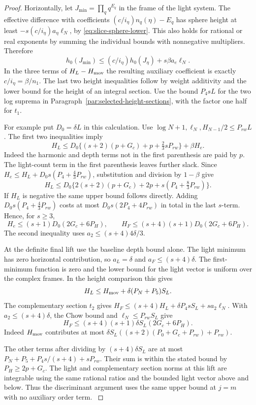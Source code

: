 \begin{proof}
Horizontally, let
\(J_{\min}=\prod_q q^{E_q}\) in the frame of the light system.
The effective difference with coefficients
\((c/i_\eta)n_q(\eta)-E_q\) has sphere height at least
\(-s(c/i_\eta)a_\eta\ell_N\), by
\eqref{eq:slice-sphere-lower}. This also holds for rational
or real exponents by summing the individual bounds with
nonnegative multipliers. Therefore
\[
 h_0(J_{\min})\le (c/i_\eta)h_0(J_\eta)+s\beta a_e\ell_N .
\]
In the three terms of \(H_L-H_{\rm mov}\) the resulting
auxiliary coefficient is exactly \(c/i_\eta=\beta/n_1\).
The last two height inequalities follow by weight additivity
and the lower bound for the height of an integral section.
Use the bound \(P_4sL\) for the two log suprema in
Paragraph~\ref{par:selected-height-sections}, with the factor
one half for \(t_1\).

For example put \(D_0=\delta L\) in this calculation.
Use \(\log N+1,\ell_N,H_{N-1}/2\le P_{rw}L\).
The first two inequalities imply
\[
 H_L\le D_0\{(s+2)(p+G_c)+p
                   +\tfrac23sP_{rw}\}+\beta H_e .
\]
Indeed the harmonic and depth terms not in the first
parenthesis are paid by \(p\). The light-count term in
the first parenthesis leaves further slack. Since
\(H_e\le H_L+D_0 s(P_4+\tfrac43P_{rw})\),
substitution and division by \(1-\beta\) give
\[
 H_L\le D_0\{2(s+2)(p+G_c)+2p+
                            s(P_4+\tfrac83P_{rw})\}.
\]
If \(H_L\) is negative the same upper bound follows
directly. Adding \(D_0s(P_4+\tfrac43P_{rw})\)
costs at most \(D_0s(2P_4+4P_{rw})\) in total
in the last \(s\)-term. Hence, for \(s\ge3\),
\[
 H_e\le(s+1)D_0(2G_c+6P_H),\qquad
 H_F\le(s+4)(s+1)D_0(2G_c+6P_H).
\]
The second inequality uses \(a_2\le (s+4)4\delta/3\).

At the definite final lift use the baseline depth bound alone.
The light minimum has zero horizontal contribution, so
\(a_L=\delta\) and \(a_F\le(s+4)\delta\). The first-minimum
function is zero and the lower bound for the light vector is
uniform over the complex frames. In the height comparison this
gives
\[
 H_L\le H_{\rm mov}+\delta(P_N+P_5)S_L .
\]
The complementary section \(t_2\) gives
\(H_F\le(s+4)H_L+\delta P_4sS_L+s a_2\ell_N\). With \(a_2\le(s+4)\delta\), the Chow bound and
\(\ell_N\le P_{rw}S_L\) give
\[
 H_F\le(s+4)(s+1)\delta S_L(2G_c+6P_H).
\]
Indeed \(H_{\rm mov}\) contributes at most
\(\delta S_L((s+2)(P_0+G_c+P_{rw})+P_{rw})\).

The other terms after dividing by \((s+4)\delta S_L\)
are at most \(P_N+P_5+P_4s/(s+4)+sP_{rw}\).
Their sum is within the stated bound by \(P_H\ge2p+G_c\).
The light and complementary section norms at this lift are
integrable using the same rational ratios and the bounded light
vector above and below. Thus the discriminant argument uses
the same upper bound at \(j=m\) with no auxiliary order term.
\label{cor:slice-heights-2}


\end{proof}
